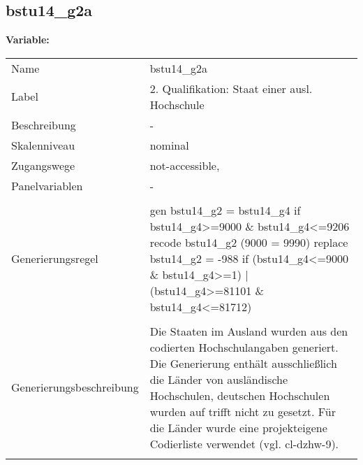 	
	
	\subsection{bstu14\_g2a}
	\label{subSection:bstu14_g2a}

	\noindent\textbf{Variable:}\\
		\begin{tabular}{lL{11.3cm}}
			\label{tableVariable:bstu14_g2a}
			Name & bstu14\_g2a \\
			Label & 2. Qualifikation: Staat einer ausl. Hochschule \\
			Beschreibung & - \\
			Skalenniveau & nominal \\
			Zugangswege &
				not-accessible,
 \\
			Panelvariablen & -
			 \\
			 \\
					Generierungsregel & gen bstu14\_g2 = bstu14\_g4 if bstu14\_g4\textgreater{}=9000 \& bstu14\_g4\textless{}=9206
recode bstu14\_g2 (9000 = 9990)
replace bstu14\_g2 = -988 if (bstu14\_g4\textless{}=9000 \& bstu14\_g4\textgreater{}=1) | (bstu14\_g4\textgreater{}=81101 \& bstu14\_g4\textless{}=81712) \\
				 \\
					Generierungsbeschreibung & Die Staaten im Ausland wurden aus den codierten Hochschulangaben generiert. Die Generierung enthält ausschließlich die Länder von ausländische Hochschulen, deutschen Hochschulen wurden auf trifft nicht zu gesetzt. Für die Länder wurde eine projekteigene Codierliste verwendet (vgl. cl-dzhw-9).
				 \\	
			 \\
		\end{tabular}






	
	\newpage
